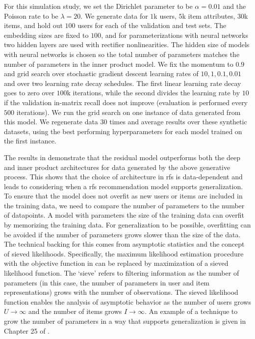 For this simulation study, we set the Dirichlet parameter to be $\alpha=0.01$ and the Poisson rate to be $\lambda=20$. We generate data for $1$k users, $5$k item attributes, $30$k items, and hold out $100$ users for each of the validation and test sets. The embedding sizes are fixed to $100$, and for parameterizations with neural networks two hidden layers are used with rectifier nonlinearities. The hidden size of models with neural networks is chosen so the total number of parameters matches the number of parameters in the inner product model. We fix the momentum to $0.9$~\citep{sutskever2013on-the-importance} and grid search over stochastic gradient descent learning rates of ${10, 1, 0.1, 0.01}$ and over two learning rate decay schedules. The first linear learning rate decay goes to zero over $100$k iterations, while the second divides the learning rate by $10$ if the validation in-matrix recall does not improve (evaluation is performed every $500$ iterations). We run the grid search on one instance of data generated from this model. We regenerate data $30$ times and average results over these synthetic datasets, using the best performing hyperparameters for each model trained on the first instance.


The results in  demonstrate that the residual model outperforms both the deep and inner product architectures for data generated by the above generative process. This shows that the choice of architecture in \gls{rfs} is data-dependent and leads to considering when a \gls{rfs} recommendation model supports generalization. To ensure that the model does not overfit as new users or items are included in the training data, we need to compare the number of parameters to the number of datapoints. A model with parameters the size of the training data can overfit by memorizing the training data. For generalization to be possible, overfitting can be avoided if the number of parameters grows slower than the size of the data. The technical backing for this comes from asymptotic statistics and the concept of sieved likelihoods. Specifically, the maximum likelihood estimation procedure with the objective function in  can be replaced by maximization of a sieved likelihood function. The `sieve' refers to filtering information as the number of parameters (in this case, the number of parameters in user and item representations) grows with the number of observations. The sieved likelihood function enables the analysis of asymptotic behavior as the number of users grows $U\rightarrow \infty$ and the number of items grows $I\rightarrow \infty$. An example of a technique to grow the number of parameters in a way that supports generalization is given in Chapter 25 of \citet{vaart1998asymptotic}.

